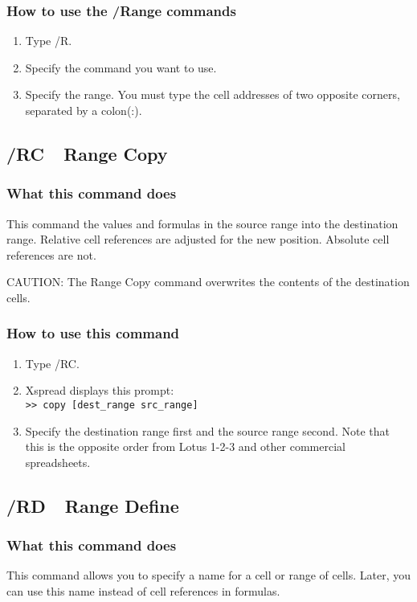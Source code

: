 \subsubsection*{How to use the /Range commands}
\begin{enumerate}
\item{Type /R.}
\item{Specify the command you want to use.}
\item{Specify the range.  You must type the cell addresses of two
        opposite corners, separated by a colon(:).}
\end{enumerate}
        
\subsection*{/RC\ \      Range Copy}

\subsubsection*{What this command does}
This command the values and formulas in the source range into the 
destination range.  Relative cell references are adjusted for the new 
position.  Absolute cell references are not.

CAUTION:  The Range Copy command overwrites the contents of the 
destination cells.

\subsubsection*{How to use this command}
\begin{enumerate}
\item{Type /RC.}
\item{Xspread displays this prompt:\\
        \verb|>> copy [dest_range src_range]|  }
\item{Specify the destination range first and the source range second.
        Note that this is the opposite order from Lotus 1-2-3 and other
        commercial spreadsheets.}
\end{enumerate}
        
\subsection*{/RD\ \      Range Define}

\subsubsection*{What this command does}
This command allows you to specify a name for a cell or range of 
cells.  Later, you can use this name instead of cell references in 
formulas.

